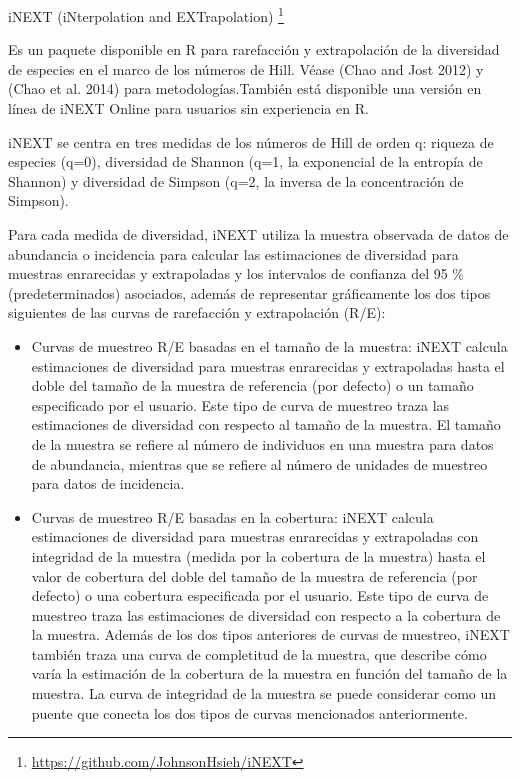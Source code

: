 \documentclass[
]{article}
\begin{document}
iNEXT (iNterpolation and EXTrapolation) \footnote{\url{https://github.com/JohnsonHsieh/iNEXT}}

Es un paquete disponible en R para rarefacción y extrapolación de la
diversidad de especies en el marco de los números de Hill. Véase (Chao
and Jost 2012) y (Chao et al. 2014) para metodologías.También está
disponible una versión en línea de iNEXT Online para usuarios sin
experiencia en R.

iNEXT se centra en tres medidas de los números de Hill de orden q:
riqueza de especies (q=0), diversidad de Shannon (q=1, la exponencial de
la entropía de Shannon) y diversidad de Simpson (q=2, la inversa de la
concentración de Simpson).

Para cada medida de diversidad, iNEXT utiliza la muestra observada de
datos de abundancia o incidencia para calcular las estimaciones de
diversidad para muestras enrarecidas y extrapoladas y los intervalos de
confianza del 95 \% (predeterminados) asociados, además de representar
gráficamente los dos tipos siguientes de las curvas de rarefacción y
extrapolación (R/E):

\begin{itemize}
\item
  Curvas de muestreo R/E basadas en el tamaño de la muestra: iNEXT
  calcula estimaciones de diversidad para muestras enrarecidas y
  extrapoladas hasta el doble del tamaño de la muestra de referencia
  (por defecto) o un tamaño especificado por el usuario. Este tipo de
  curva de muestreo traza las estimaciones de diversidad con respecto al
  tamaño de la muestra. El tamaño de la muestra se refiere al número de
  individuos en una muestra para datos de abundancia, mientras que se
  refiere al número de unidades de muestreo para datos de incidencia.
\item
  Curvas de muestreo R/E basadas en la cobertura: iNEXT calcula
  estimaciones de diversidad para muestras enrarecidas y extrapoladas
  con integridad de la muestra (medida por la cobertura de la muestra)
  hasta el valor de cobertura del doble del tamaño de la muestra de
  referencia (por defecto) o una cobertura especificada por el usuario.
  Este tipo de curva de muestreo traza las estimaciones de diversidad
  con respecto a la cobertura de la muestra. Además de los dos tipos
  anteriores de curvas de muestreo, iNEXT también traza una curva de
  completitud de la muestra, que describe cómo varía la estimación de la
  cobertura de la muestra en función del tamaño de la muestra. La curva
  de integridad de la muestra se puede considerar como un puente que
  conecta los dos tipos de curvas mencionados anteriormente.
\end{itemize}
\end{document}
